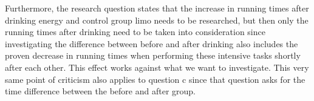 \documentclass[
]{article}
\begin{document}
Furthermore, the research question states that the increase in running
times after drinking energy and control group limo needs to be
researched, but then only the running times after drinking need to be
taken into consideration since investigating the difference between
before and after drinking also includes the proven decrease in running
times when performing these intensive tasks shortly after each other.
This effect works against what we want to investigate. This very same
point of criticism also applies to question c since that question asks
for the time difference between the before and after group.
\end{document}
